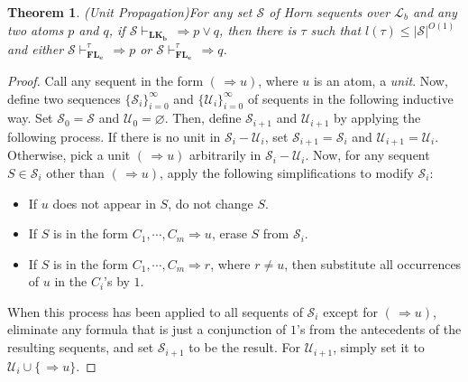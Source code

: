 \documentclass[12pt,a4paper]{article}
\theoremstyle{plain}
\newtheorem{theorem}{Theorem}
\theoremstyle{definition}
\newcommand{\LKb}{\mathbf{LK_b}}
\begin{document}
\begin{theorem}(Unit Propagation)\label{UnitPropagation}
For any set $\mathcal{S}$ of Horn sequents over $\mathcal{L}_b$ and any two atoms $p$ and $q$, if $\mathcal{S} \vdash_{\LKb} \, \Rightarrow p \vee q$, then there is $\tau$ such that $l(\tau) \leq |\mathcal{S}|^{O(1)}$ and either $\mathcal{S} \vdash_{\mathbf{FL_e}}^{\tau} \, \Rightarrow p$ or $\mathcal{S} \vdash_{\mathbf{FL_e}}^{\tau} \, \Rightarrow q$. 
\end{theorem}
\begin{proof}
Call any sequent in the form $(\, \Rightarrow u)$, where $u$ is an atom, a \emph{unit}. Now, define two sequences $\{\mathcal{S}_i\}_{i=0}^{\infty}$ and $\{\mathcal{U}_i\}_{i=0}^{\infty}$ of sequents in the following inductive way. Set $\mathcal{S}_0=\mathcal{S}$ and $\mathcal{U}_0=\varnothing$. Then, define $\mathcal{S}_{i+1}$ and $\mathcal{U}_{i+1}$ by applying the following process.
If there is no unit in $\mathcal{S}_i-\mathcal{U}_i$, set $\mathcal{S}_{i+1}=\mathcal{S}_{i}$ and $\mathcal{U}_{i+1}=\mathcal{U}_i$. Otherwise, pick a unit $(\, \Rightarrow u)$ arbitrarily in $\mathcal{S}_i-\mathcal{U}_i$. Now, for any sequent $S \in \mathcal{S}_i$ other than $(\, \Rightarrow u)$, apply the following simplifications to modify $\mathcal{S}_i$:
\begin{itemize}
\item[$(i)$] 
If $u$ does not appear in $S$, do not change $S$.
\item[$(ii)$] 
If $S$ is in the form $C_1, \cdots, C_m \Rightarrow u$, erase $S$ from $\mathcal{S}_i$.
\item[$(iii)$] 
If $S$ is in the form $C_1, \cdots, C_m \Rightarrow r$, where $r \neq u$, then substitute all occurrences of $u$ in the $C_i$'s by $1$.
\end{itemize}
When this process has been applied to all sequents of $\mathcal{S}_i$ except for $(\, \Rightarrow u)$, eliminate any formula that is just a conjunction of $1$'s from the antecedents of the resulting sequents, and set $\mathcal{S}_{i+1}$ to be the result. For $\mathcal{U}_{i+1}$, simply set it to $\mathcal{U}_i \cup \{\, \Rightarrow u\}$.


\end{proof}
\end{document}
